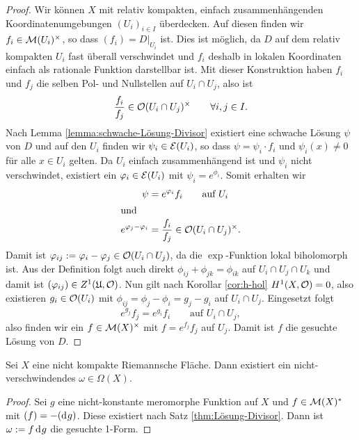 \begin{proof}
  Wir können $X$ mit relativ kompakten, einfach zusammenhängenden
  Koordinatenumgebungen $(U_i)_{i \in I}$ überdecken. Auf diesen
  finden wir $f_i \in \mathcal{M}(U_i)^\times$, so dass $(f_i) =
  D|_{U_i}$ ist. Dies ist möglich, da $D$ auf dem relativ kompakten $U_i$
  fast überall verschwindet und $f_i$ deshalb in lokalen Koordinaten
  einfach als rationale Funktion darstellbar ist. 
  Mit dieser Konstruktion haben $f_i$ und $f_j$ die selben Pol- und
  Nullstellen auf $U_i \cap U_j$, also ist
  \[
  \frac{f_i}{f_j} \in \mathcal{O}(U_i \cap U_j)^\times \qquad \forall i,j \in I.
  \]
  Nach Lemma \ref{lemma:schwache-Lösung-Divisor} existiert eine
  schwache Lösung $\psi$ von $D$ und auf den $U_i$ finden wir $\psi_i
  \in \mathcal{E}(U_i)$, so dass $\psi = \psi_i \cdot f_i$ und $\psi_i(x)
  \neq 0$ für alle $x \in U_i$ gelten. 
  Da $U_i$ einfach zusammenhängend ist und $\psi_i$ nicht
  verschwindet, existiert ein $\varphi_i \in \mathcal{E}(U_i)$ mit $\psi_i =
  e^{\phi_i}$. Somit erhalten wir
  \begin{align*}
  \psi & = e^{\varphi_i} f_i \qquad \text{auf } U_i \\
  \intertext{und}
  e^{\varphi_j - \varphi_i} & = \frac{f_i}{f_j} \in \mathcal{O}(U_i \cap U_j)^\times.
  \end{align*}
  Damit ist $\varphi_{ij} := \varphi_i - \varphi_j \in \mathcal{O}(U_i \cap U_j)$, da
  die $\exp$-Funktion lokal biholomorph ist. Aus der Definition folgt
  auch direkt $\phi_{ij} + \phi_{jk} = \phi_{ik}$ auf $U_i \cap U_j
  \cap U_k$ und damit ist $(\varphi_{ij}) \in Z^1(\mathfrak{U}, \mathcal{O})$. 
  Nun gilt nach Korollar \ref{cor:h-hol} $H^1(X, \mathcal{O}) = 0$, also existieren $g_i \in \mathcal{O}(U_i)$ mit
  $\phi_{ij} = \phi_j - \phi_i = g_j - g_i$ auf $U_i \cap U_j$.
  Eingesetzt folgt
  \[
  e^{g_j} f_j = e^{g_i} f_i \qquad \text{auf } U_i \cap U_j,
  \]
  also finden wir ein $f \in \mathcal{M}(X)^\times$ mit $f = e^{f_j} f_j$ auf
  $U_j$. Damit ist $f$ die gesuchte Lösung von $D$.
\end{proof}

\begin{cor}
  \label{cor:nicht-verschwindende-1-form}
  Sei $X$ eine nicht kompakte Riemannsche Fläche. 
  Dann existiert ein nicht-verschwindendes $\omega \in \Omega(X)$.
\end{cor}

\begin{proof}
  Sei $g$ eine nicht-konstante meromorphe Funktion auf $X$ und $f \in
  \mathcal{M}(X)^\ast$ mit $(f) = -(\d[g])$. Diese existiert nach Satz
  \ref{thm:Lösung-Divisor}. Dann ist $\omega := f \d[g]$ die gesuchte 1-Form.
\end{proof}






